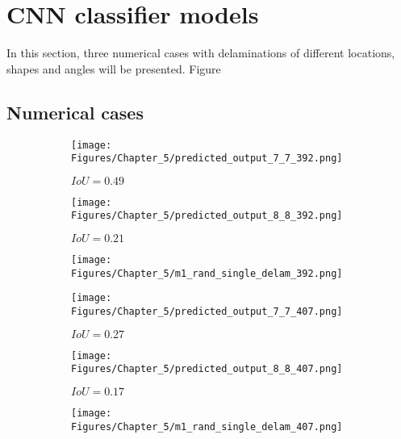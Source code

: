\section{CNN classifier models}
\label{sec51}

In this section, three numerical cases with delaminations of different locations, shapes and angles will be presented.
Figure

\subsection{Numerical cases}
\label{sec511}

\begin{figure} [h!]
	\centering
	\begin{subfigure}[b]{0.32\textwidth}
		\centering
		\texttt{[image: Figures/Chapter\_5/predicted\_output\_7\_7\_392.png]}
		\caption{\(IoU=0.49\)}
		\label{fig:pred_7_7_case_392}
	\end{subfigure}
	\hfill
	\begin{subfigure}[b]{0.32\textwidth}
		\centering
		\texttt{[image: Figures/Chapter\_5/predicted\_output\_8\_8\_392.png]}
		\caption{\(IoU=0.21\)}
		\label{fig:pred_8_8_case_392}
	\end{subfigure}
	\hfill
	\begin{subfigure}[b]{0.32\textwidth}
		\centering
		\texttt{[image: Figures/Chapter\_5/m1\_rand\_single\_delam\_392.png]}
		\caption{}
		\label{fig:GT_case_392}
	\end{subfigure}	
	\hfill
	\begin{subfigure}[b]{0.32\textwidth}
		\centering
		\texttt{[image: Figures/Chapter\_5/predicted\_output\_7\_7\_407.png]}
		\caption{\(IoU=0.27\)}
		\label{fig:pred_7_7_case_407}
	\end{subfigure}
	\hfill
	\begin{subfigure}[b]{0.32\textwidth}
		\centering
		\texttt{[image: Figures/Chapter\_5/predicted\_output\_8\_8\_407.png]}
		\caption{\(IoU=0.17\)}
		\label{fig:pred_8_8_case_407}
	\end{subfigure}
	\hfill
	\begin{subfigure}[b]{0.32\textwidth}
		\centering
		\texttt{[image: Figures/Chapter\_5/m1\_rand\_single\_delam\_407.png]}
		\caption{}
		\label{fig:GT_case_407}
	\end{subfigure}
	\hfill
	\begin{subfigure}[b]{0.32\textwidth}

\end{subfigure}
\end{figure}
